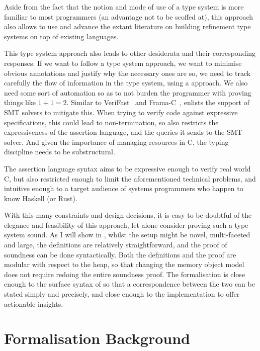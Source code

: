 Aside from the fact that the notion and mode of use of a type system is more
familiar to most programmers (an advantage not to be scoffed at), this approach
also allows  to use and advance the extant literature on building
refinement type systems on top of existing languages.

This type system approach also leads to other desiderata and their
corresponding responses. If we want to follow a type system approach, we want
to minimise obvious annotations and justify why the necessary ones are so, we
need to track carefully the flow of information in the type system, using a
 approach. We also need some sort of automation so as to not
burden the programmer with proving things like $1 + 1 = 2$. Similar to
VeriFast~ and Frama-C~,
 enlists the support of SMT solvers to mitigate this. When trying to
verify code against expressive specifications, this could lead to
non-termination, so  also restricts the expressiveness of the assertion
language, and the queries it sends to the SMT solver. And given the importance
of managing resources in C, the typing discipline needs to be substructural.

The  assertion language syntax aims to be expressive enough to verify
real world C, but also restricted enough to limit the aforementioned technical
problems, and intuitive enough to a target audience of systems programmers who
happen to know Haskell (or Rust).

With this many constraints and design decisions, it is easy to be doubtful of the
elegance and feasibility of this approach, let alone consider proving such a
type system sound. As I will show in , whilst the setup
might be novel, multi-faceted and large, the definitions are relatively
straightforward, and the proof of soundness can be done syntactically. Both the
definitions and the proof are modular with respect to the heap, so that
changing the memory object model does not require redoing the entire soundness
proof. The formalisation is close enough to the surface syntax of  so
that a correspondence between the two can be stated simply and precisely, and
close enough to the implementation to offer actionable insights.

\chapter{Formalisation Background}%
\label{chap:formal-background}

